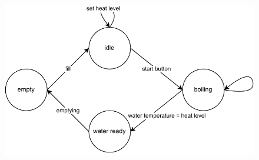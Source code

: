\begin{figure}[H]
    \centering
    \includegraphics[width=\textwidth]{../digitalDesign/lecture7.pdf}
\end{figure}